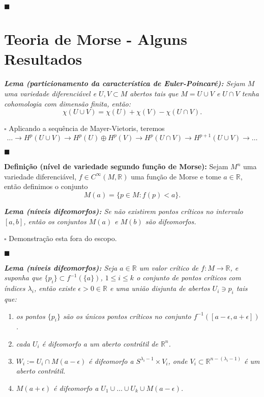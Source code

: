 \documentclass{article}
\begin{document}
	$\blacksquare$
	
	\section{Teoria de Morse - Alguns Resultados}
	
	\textit{\textbf{Lema (particionamento da característica de Euler-Poincaré):} Sejam $M$ uma variedade diferenciável e $U, V \subset M$ abertos tais que $M = U \cup V$ e $U \cap V$ tenha cohomologia com dimensão finita, então:}
	$$
	\chi(U \cup V) = \chi(U) + \chi(V) - \chi(U \cap V).
	$$
	
	$\square$ Aplicando a sequência de Mayer-Vietoris, teremos
	$$
	\dots \to H^{p}(U \cup V) \to H^{p}(U) \oplus H^{p}(V) \to H^{p}(U  \cap V) \to H^{p+1}(U \cup V) \to \dots
	$$
	
	$\blacksquare$
	
	\vspace{2mm}
	\textbf{Definição (nível de variedade segundo função de Morse):} Sejam $M^{n}$ uma variedade diferenciável, $f \in C^{\infty}(M, \mathbb{R})$ uma função de Morse e tome $a \in \mathbb{R}$, então definimos o conjunto
	$$
	M(a) = \{p \in M: f(p) <a \}.
	$$
	
	\textit{\textbf{Lema (níveis difeomorfos):} Se não existirem pontos críticos no intervalo $[a, b]$, então os conjuntos $M(a)$ e $M(b)$ são difeomorfos.}
	
	$\square$ Demonstração esta fora do escopo.
	
	$\blacksquare$
	
	\vspace{2mm}
	\textit{\textbf{Lema (níveis difeomorfos):} Seja $a \in \mathbb{R}$ um valor crítico de $f:M \to \mathbb{R}$, e suponha que $\{p_{i}\} \subset f^{-1}(\{a\})$, $1\leq i \leq k$ o conjunto de pontos críticos com índices $\lambda_{i}$, então existe $\epsilon > 0 \in \mathbb{R}$ e uma união disjunta de abertos $U_{i} \ni p_{i}$ tais que:}
	\begin{enumerate}
		\item  \textit{os pontos $\{p_{i}\}$ são os únicos pontos críticos no conjunto $f^{-1}([a - \epsilon, a + \epsilon])$.}
		
		\item \textit{cada $U_{i}$ é difeomorfo a um aberto contrátil de $\mathbb{R}^{n}$.}
		
		\item \textit{$W_{i} := U_{i} \cap M(a-\epsilon)$ é difeomorfo a $S^{\lambda_{i} - 1} \times V_{i}$, onde $V_{i} \subset \mathbb{R}^{n - (\lambda_{i} - 1)}$ é um aberto contrátil.}
		
		\item \textit{$M(a+\epsilon)$ é difeomorfo a $U_{1} \cup \dots \cup U_{k} \cup M(a-\epsilon)$.}
	\end{enumerate}
	
\end{document}
